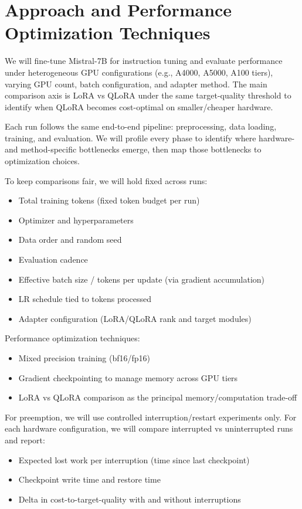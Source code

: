 \documentclass[10pt]{article}
\begin{document}
\section{Approach and Performance Optimization Techniques}
We will fine-tune Mistral-7B for instruction tuning and evaluate performance under heterogeneous GPU configurations (e.g., A4000, A5000, A100 tiers), varying GPU count, batch configuration, and adapter method. The main comparison axis is LoRA vs QLoRA under the same target-quality threshold to identify when QLoRA becomes cost-optimal on smaller/cheaper hardware.

Each run follows the same end-to-end pipeline: preprocessing, data loading, training, and evaluation. We will profile every phase to identify where hardware- and method-specific bottlenecks emerge, then map those bottlenecks to optimization choices.

To keep comparisons fair, we will hold fixed across runs:
\begin{itemize}
  \item Total training tokens (fixed token budget per run)
  \item Optimizer and hyperparameters
  \item Data order and random seed
  \item Evaluation cadence
  \item Effective batch size / tokens per update (via gradient accumulation)
  \item LR schedule tied to tokens processed
  \item Adapter configuration (LoRA/QLoRA rank and target modules)
\end{itemize}

Performance optimization techniques:
\begin{itemize}
  \item Mixed precision training (bf16/fp16)
  \item Gradient checkpointing to manage memory across GPU tiers
  \item LoRA vs QLoRA comparison as the principal memory/computation trade-off
\end{itemize}

For preemption, we will use controlled interruption/restart experiments only. For each hardware configuration, we will compare interrupted vs uninterrupted runs and report:
\begin{itemize}
  \item Expected lost work per interruption (time since last checkpoint)
  \item Checkpoint write time and restore time
  \item Delta in cost-to-target-quality with and without interruptions
\end{itemize}
\end{document}
